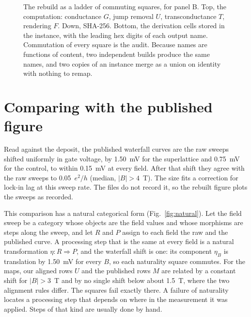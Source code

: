 \documentclass[11pt]{article}
\begin{document}
\begin{figure}[h]
\centering
{}
\caption{The rebuild as a ladder of commuting squares, for panel B. Top, the computation: conductance $G$, jump removal $U$, transconductance $T$, rendering $F$. Down, SHA-256. Bottom, the derivation cells stored in the instance, with the leading hex digits of each output name. Commutation of every square is the audit. Because names are functions of content, two independent builds produce the same names, and two copies of an instance merge as a union on identity with nothing to remap.}
\label{fig:ladder}
\end{figure}

\section{Comparing with the published figure}

Read against the deposit, the published waterfall curves are the raw sweeps shifted uniformly in gate voltage, by 1.50~mV for the superlattice and 0.75~mV for the control, to within 0.15~mV at every field. After that shift they agree with the raw sweeps to 0.05~$e^2/h$ (median, $|B|>4$~T). The size fits a correction for lock-in lag at this sweep rate. The files do not record it, so the rebuilt figure plots the sweeps as recorded.

This comparison has a natural categorical form (Fig.~\ref{fig:natural}). Let the field sweep be a category whose objects are the field values and whose morphisms are steps along the sweep, and let $R$ and $P$ assign to each field the raw and the published curve. A processing step that is the same at every field is a natural transformation $\eta: R \Rightarrow P$, and the waterfall shift is one: its component $\eta_B$ is translation by 1.50~mV for every $B$, so each naturality square commutes. For the maps, our aligned rows $U$ and the published rows $M$ are related by a constant shift for $|B|>3$~T and by no single shift below about 1.5~T, where the two alignment rules differ. The squares fail exactly there. A failure of naturality locates a processing step that depends on where in the measurement it was applied. Steps of that kind are usually done by hand.
\end{document}
